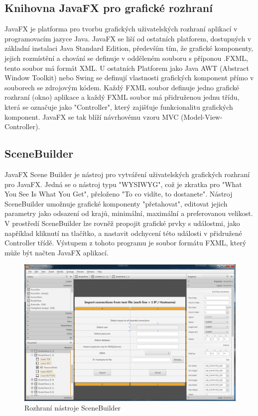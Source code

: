 \documentclass[czech,bachelor,public,dept460,male,cpdeclaration,twoside]{diploma}
\begin{document}
\subsection{Knihovna JavaFX pro grafické rozhraní}
JavaFX je platforma pro tvorbu grafických uživatelských rozhraní aplikací v programovacím jazyce Java. JavaFX se liší od ostatních platforem, dostupných v základní instalaci Java Standard Edition, především tím, že grafické komponenty, jejich rozmístění a chování se definuje v odděleném souboru s příponou .FXML, tento soubor má formát XML. U ostatních Platforem jako Java AWT (Abstract Window Toolkit) nebo Swing se definují vlastnosti grafických komponent přímo v souborech se zdrojovým kódem. Každý FXML soubor definuje jedno grafické rozhraní (okno) aplikace a každý FXML soubor má přidruženou jednu třídu, která se označuje jako "Controller", který zajišťuje funkcionalitu grafických komponent. JavaFX se tak blíží návrhovému vzoru MVC (Model-View-Controller).

\subsection{SceneBuilder}
JavaFX Scene Builder je nástroj pro vytváření uživatelských grafických rozhraní pro JavaFX. Jedná se o nástroj typu "WYSIWYG", což je zkratka pro "What You See Is What You Get", přeloženo "To co vidíte, to dostanete". Nástroj SceneBuilder umožnuje grafické komponenty "přetahovat", editovat jejich parametry jako odsazení od krajů, minimální, maximální a preferovanou velikost. V prostředí SceneBuilder lze rovněž propojit grafické prvky s událostmi, jako například kliknutí na tlačítko, a nastavit odchycení této události v přidružené Controller třídě. Výstupem z tohoto programu je soubor formátu FXML, který může být načten JavaFX aplikací.
\cite{scenebuilder}

\begin{figure}[!h]\centering\includegraphics[width=1.0\textwidth]{Figures/SceneBuilder.png}\caption{Rozhraní nástroje SceneBuilder}
\end{figure}
\end{document}
